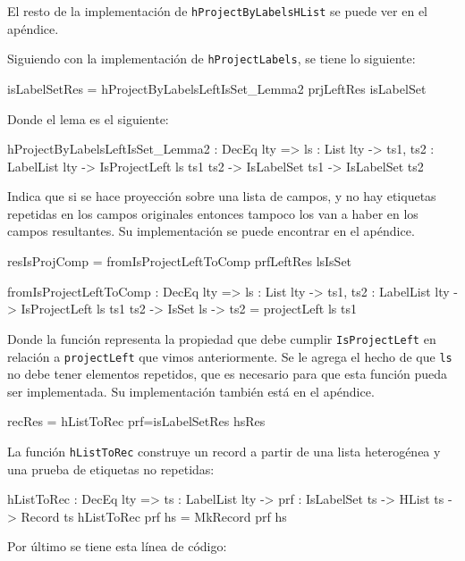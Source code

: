 El resto de la implementación de \texttt{hProjectByLabelsHList} se puede ver en el apéndice.

Siguiendo con la implementación de \texttt{hProjectLabels}, se tiene lo siguiente:

\begin{code}
isLabelSetRes =
  hProjectByLabelsLeftIsSet_Lemma2 prjLeftRes isLabelSet
\end{code}

Donde el lema es el siguiente:

\begin{code}
hProjectByLabelsLeftIsSet_Lemma2 : DecEq lty => {ls : List lty} ->
  {ts1, ts2 : LabelList lty} -> IsProjectLeft ls ts1 ts2 ->
  IsLabelSet ts1 -> IsLabelSet ts2
\end{code}

Indica que si se hace proyección sobre una lista de campos, y no hay etiquetas repetidas en los campos originales entonces tampoco los van a haber en los campos resultantes. Su implementación se puede encontrar en el apéndice.

\begin{code}
resIsProjComp = fromIsProjectLeftToComp prfLeftRes lsIsSet

fromIsProjectLeftToComp : DecEq lty => {ls : List lty} ->
  {ts1, ts2 : LabelList lty} -> IsProjectLeft ls ts1 ts2 ->
  IsSet ls -> ts2 = projectLeft ls ts1
\end{code}

Donde la función representa la propiedad que debe cumplir \texttt{IsProjectLeft} en relación a \texttt{projectLeft} que vimos anteriormente. Se le agrega el hecho de que \texttt{ls} no debe tener elementos repetidos, que es necesario para que esta función pueda ser implementada. Su implementación también está en el apéndice.

\begin{code}
recRes = hListToRec {prf=isLabelSetRes} hsRes
\end{code}

La función \texttt{hListToRec} construye un record a partir de una lista heterogénea y una prueba de etiquetas no repetidas:

\begin{code}
hListToRec : DecEq lty => {ts : LabelList lty} ->
  {prf : IsLabelSet ts} -> HList ts -> Record ts
hListToRec {prf} hs = MkRecord prf hs
\end{code}

Por último se tiene esta línea de código:

